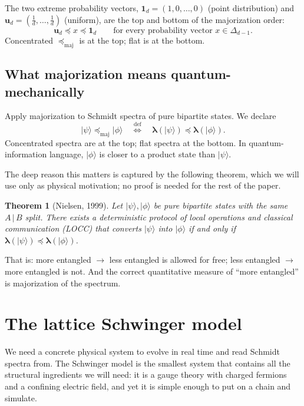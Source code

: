 \documentclass[11pt,a4paper]{article}
\theoremstyle{definition}
\theoremstyle{plain}
\newtheorem{theorem}[definition]{Theorem}
\theoremstyle{remark}
\newcommand{\ket}[1]{\lvert #1 \rangle}
\newcommand{\maj}{\mathrm{maj}}
\begin{document}
The two extreme probability vectors,
$\mathbf{1}_d = (1, 0, \ldots, 0)$ (point distribution) and
$\mathbf{u}_d = (\tfrac1d, \ldots, \tfrac1d)$ (uniform), are the
top and bottom of the majorization order:
\begin{equation}
  \mathbf{u}_d \preceq x \preceq \mathbf{1}_d \qquad
  \text{for every probability vector } x \in \Delta_{d-1}.
\end{equation}
Concentrated $\preceq_{\maj}$ is at the top; flat is at the bottom.

\subsection{What majorization means quantum-mechanically}

Apply majorization to Schmidt spectra of pure bipartite states.  We
declare
\begin{equation}\label{eq:psimaj}
  \ket{\psi} \preceq_{\maj} \ket{\phi}
  \quad \stackrel{\text{def}}{\iff} \quad
  \bm{\lambda}(\ket{\psi}) \preceq \bm{\lambda}(\ket{\phi}).
\end{equation}
Concentrated spectra are at the top; flat spectra at the bottom.  In
quantum-information language, $\ket{\phi}$ is closer to a product
state than $\ket{\psi}$.

The deep reason this matters is captured by the following theorem,
which we will use only as physical motivation; no proof is needed for
the rest of the paper.

\begin{theorem}[Nielsen, 1999]\label{thm:nielsen}
Let $\ket{\psi}, \ket{\phi}$ be pure bipartite states with the same
$A\,|\,B$ split.  There exists a deterministic protocol of local
operations and classical communication (LOCC) that converts
$\ket{\psi}$ into $\ket{\phi}$ if and only if
$\bm{\lambda}(\ket{\psi}) \preceq \bm{\lambda}(\ket{\phi})$.
\end{theorem}
That is: more entangled $\rightarrow$ less entangled is allowed for
free; less entangled $\rightarrow$ more entangled is not.  And the
correct quantitative measure of ``more entangled'' is majorization
of the spectrum.

\section{The lattice Schwinger model}\label{sec:schwinger}

We need a concrete physical system to evolve in real time and read
Schmidt spectra from.  The Schwinger model is the smallest system that
contains all the structural ingredients we will need: it is a gauge
theory with charged fermions and a confining electric field, and yet
it is simple enough to put on a chain and simulate.
\end{document}
